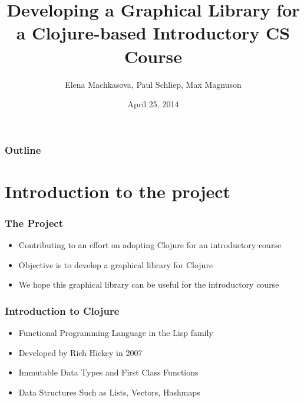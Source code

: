 \documentclass{beamer}
\begin{document}
\title{Developing a Graphical Library for a Clojure-based Introductory CS Course}
\author{Elena Machkasova, Paul Schliep, Max Magnuson}
\date{April 25, 2014}

\begin{frame}
  \titlepage
\end{frame}

\begin{frame}

  \frametitle{Outline}
\tableofcontents

\end{frame}

\section{Introduction to the project}

\begin{frame}
\frametitle{The Project}
\begin{itemize}
\item Contributing to an effort on adopting Clojure for an introductory course
\item Objective is to develop a graphical library for Clojure
\item We hope this graphical library can be useful for the introductory course
\end{itemize}
\end{frame}

\begin{frame}
\frametitle{Introduction to Clojure}
\begin{itemize}
\item Functional Programming Language in the Lisp family
\item Developed by Rich Hickey in 2007
\item Immutable Data Types and First Class Functions
\item Data Structures Such as Lists, Vectors, Hashmaps
\end{itemize}
\end{frame}
\end{document}

